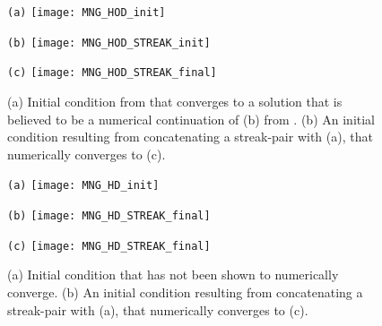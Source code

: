 
\begin{figure}
\begin{minipage}[height=.3\textheight]{.32\textwidth}
\centering \small{\texttt{(a)}}
\texttt{[image: MNG\_HOD\_init]}
\end{minipage}
\begin{minipage}[height=.3\textheight]{.32\textwidth}
\centering \small{\texttt{(b)}}
\texttt{[image: MNG\_HOD\_STREAK\_init]}
\end{minipage}
\begin{minipage}[height=.3\textheight]{.32\textwidth}
\centering \small{\texttt{(c)}}
\texttt{[image: MNG\_HOD\_STREAK\_final]}
\end{minipage}
\caption{ \label{fig:MNGhodstreak}
(a) Initial condition from  that converges to
a solution that is believed to be a numerical continuation of (b) from . (b) An initial condition
resulting from concatenating a streak-pair with (a), that
numerically converges to (c).
}
\end{figure}

\begin{figure}
\begin{minipage}[height=.3\textheight]{.32\textwidth}
\centering \small{\texttt{(a)}}
\texttt{[image: MNG\_HD\_init]}
\end{minipage}
\begin{minipage}[height=.3\textheight]{.32\textwidth}
\centering \small{\texttt{(b)}}
\texttt{[image: MNG\_HD\_STREAK\_final]}
\end{minipage}
\begin{minipage}[height=.3\textheight]{.32\textwidth}
\centering \small{\texttt{(c)}}
\texttt{[image: MNG\_HD\_STREAK\_final]}
\end{minipage}
\caption{ \label{fig:MNGhdstreak}
(a) Initial condition that has not been shown to numerically converge. (b) An initial condition
resulting from concatenating a streak-pair with (a), that
numerically converges to (c).
}
\end{figure}



